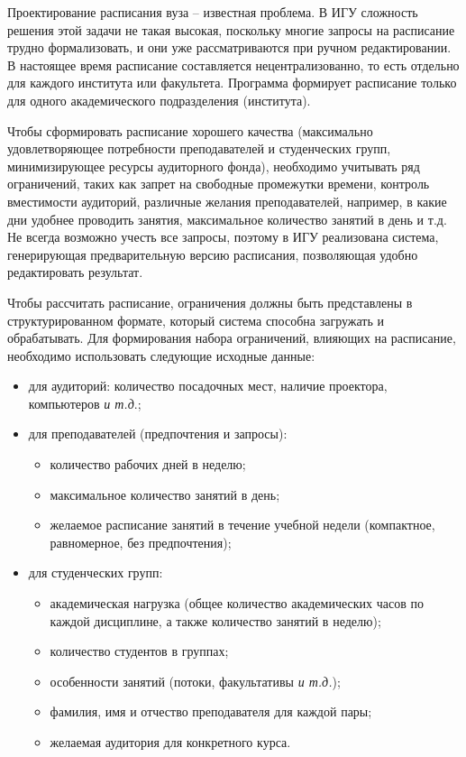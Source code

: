 \documentclass[
]{aiitart}
\begin{document}
Проектирование расписания вуза -- известная проблема. В ИГУ сложность решения этой задачи не такая высокая, поскольку многие запросы на расписание трудно формализовать, и они уже рассматриваются при ручном редактировании. В настоящее время расписание составляется нецентрализованно, то есть отдельно для каждого института или факультета.  Программа формирует расписание только для одного академического подразделения (института).

Чтобы сформировать расписание хорошего качества (максимально удовлетворяющее потребности преподавателей и студенческих групп, минимизирующее ресурсы аудиторного фонда), необходимо учитывать ряд ограничений, таких как запрет на свободные промежутки времени, контроль вместимости аудиторий, различные желания преподавателей, например, в какие дни удобнее проводить занятия, максимальное количество занятий в день и т.д. Не всегда возможно учесть все запросы, поэтому в ИГУ реализована система, генерирующая предварительную версию расписания, позволяющая удобно редактировать результат.

Чтобы рассчитать расписание, ограничения должны быть представлены в структурированном формате, который система способна загружать и обрабатывать. Для формирования набора ограничений, влияющих на расписание, необходимо использовать следующие исходные данные:
\begin{itemize}
\item для аудиторий: количество посадочных мест, наличие проектора, компьютеров \emph{и т.д}.;
\item для преподавателей (предпочтения и запросы):
\begin{itemize}
\item количество рабочих дней в неделю;
\item максимальное количество занятий в день;
\item желаемое расписание занятий в течение учебной недели (компактное, равномерное, без предпочтения);
\end{itemize}
\item для студенческих групп:
\begin{itemize}
\item академическая нагрузка (общее количество академических часов по каждой дисциплине, а также количество занятий в неделю);
\item количество студентов в группах;
\item особенности занятий (потоки, факультативы \emph{и т.д.});
\item фамилия, имя и отчество преподавателя для каждой пары;
\item желаемая аудитория для конкретного курса.
\end{itemize}
\end{itemize}
\end{document}
